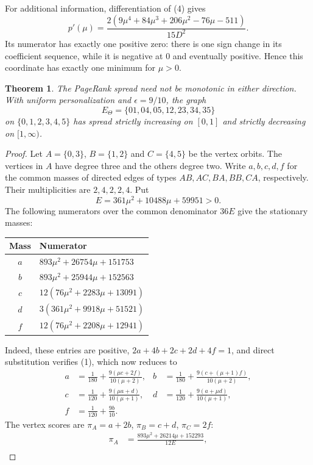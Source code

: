 \documentclass[11pt]{article}
\newtheorem{theorem}{Theorem}
\begin{document}
For additional information, differentiation of (4) gives
\[
 p'(\mu)=\frac{2(9\mu^4+84\mu^3+206\mu^2-76\mu-511)}{15D^2}.
\]
Its numerator has exactly one positive zero: there is one sign
change in its coefficient sequence, while it is negative at $0$
and eventually positive. Hence this coordinate has exactly one
minimum for $\mu>0$.

\begin{theorem}
The PageRank spread need not be monotonic in either direction.
With uniform personalization and $\epsilon=9/10$, the graph
\[
 E_\Theta=\{01,04,05,12,23,34,35\}
\]
on $\{0,1,2,3,4,5\}$ has spread strictly increasing on $[0,1]$
and strictly decreasing on $[1,\infty)$.
\end{theorem}
\begin{proof}
Let $A=\{0,3\}$, $B=\{1,2\}$ and $C=\{4,5\}$ be the vertex
orbits. The vertices in $A$ have degree three and the others
degree two. Write $a,b,c,d,f$ for the common masses of directed
edges of types $AB,AC,BA,BB,CA$, respectively. Their multiplicities
are $2,4,2,2,4$. Put
\[
 E=361\mu^2+10488\mu+59951>0.
\]
The following numerators over the common denominator $36E$ give
the stationary masses:
\begin{center}
\begin{tabular}{cl}
\toprule
Mass & Numerator\\
\midrule
$a$ & $893\mu^2+26754\mu+151753$\\
$b$ & $893\mu^2+25944\mu+152563$\\
$c$ & $12(76\mu^2+2283\mu+13091)$\\
$d$ & $3(361\mu^2+9918\mu+51521)$\\
$f$ & $12(76\mu^2+2208\mu+12941)$\\
\bottomrule
\end{tabular}
\end{center}
Indeed, these entries are positive, $2a+4b+2c+2d+4f=1$, and
direct substitution verifies (1), which now reduces to
\begin{align*}
 a&=\frac1{180}+\frac{9(\mu c+2f)}{10(\mu+2)},&
 b&=\frac1{180}+\frac{9(c+(\mu+1)f)}{10(\mu+2)},\\
 c&=\frac1{120}+\frac{9(\mu a+d)}{10(\mu+1)},&
 d&=\frac1{120}+\frac{9(a+\mu d)}{10(\mu+1)},\\
 f&=\frac1{120}+\frac{9b}{10}.&&
\end{align*}
The vertex scores are $\pi_A=a+2b$, $\pi_B=c+d$, $\pi_C=2f$:
\begin{align*}
 \pi_A&=\frac{893\mu^2+26214\mu+152293}{12E},\\

\end{align*}
\end{proof}
\end{document}

